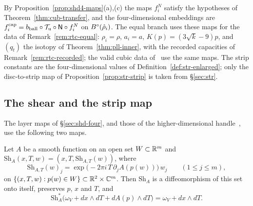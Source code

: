 \begin{remark}\label{rem:shd-four}
By Proposition~\ref{prop:shd4-maps}(a),(c) the maps $f^N_i$ satisfy the hypotheses of Theorem~\ref{thm:cub-transfer}, and
the four-dimensional embeddings are
$f^{\rm cap}_i=b_{\rm ball}\circ\mathcal T_{\rm u}\circ\mathsf N\circ f^N_i$ on $B^{\circ}(\hat\rho_i)$. The equal branch uses these maps for the data of
Remark~\ref{rem:rtc-equal}: $\rho_i=\rho$, $a_i=a$, $K(p)=(3\sqrt k-9)p$, and $(q_t)$ the isotopy of
Theorem~\ref{thm:pll-inner}, with the recorded capacities of Remark~\ref{rem:rtc-recorded}; the valid cubic data
of~\cite{SongHD} use the same maps. The strip constants are
the four-dimensional values of Definition~\ref{def:str-enlarged}; only the disc-to-strip map of Proposition~\ref{prop:str-strip}
is taken from \S\ref{sec:str}.
\end{remark}

\subsection{The shear and the strip map}\label{sec:shd-shear}

The layer maps of \S\ref{sec:shd-four}, and those of the higher-dimensional handle~\cite{SongHD}, use the
following two maps.

\begin{lemma}\label{lem:hdl-shear}
Let $A$ be a smooth function on an open set $W\subset\mathbb{R}^m$ and $\mathrm{Sh}_A(x,T,w)=(x,T,\mathrm{Sh}_{A,T}(w))$, where
\[
 \mathrm{Sh}_{A,T}(w)_j=\exp\big(-2\pi i\,T\,\partial_jA(p(w))\big)\,w_j\qquad(1\le j\le m),
\]
on $\{(x,T,w):p(w)\in W\}\subset\mathbb{R}^2\times\mathbb{C}^m$. Then $\mathrm{Sh}_A$ is a diffeomorphism of this set onto itself, preserves
$p$, $x$ and $T$, and
\[
 \mathrm{Sh}_A^*\big(\omega_V+dx\wedge dT+dA(p)\wedge dT\big)=\omega_V+dx\wedge dT .
\]
\end{lemma}

